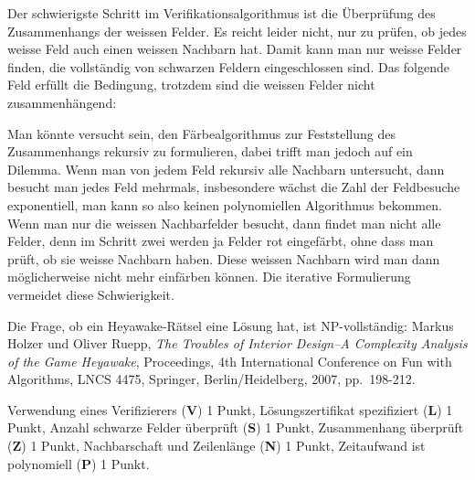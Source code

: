 \begin{diskussion}
Der schwierigste Schritt im Verifikationsalgorithmus ist die Überprüfung
des Zusammenhangs der weissen Felder.
Es reicht leider nicht, nur zu prüfen, ob jedes weisse Feld auch einen
weissen Nachbarn hat.
Damit kann man nur weisse Felder finden, die vollständig von schwarzen
Feldern eingeschlossen sind.
Das folgende Feld erfüllt die Bedingung, trotzdem sind die weissen
Felder nicht zusammenhängend:
\begin{center}
\def\h{1}
\end{center}

Man könnte versucht sein, den Färbealgorithmus zur Feststellung des
Zusammenhangs rekursiv zu formulieren, dabei trifft man jedoch auf ein
Dilemma.
Wenn man von jedem Feld rekursiv alle Nachbarn untersucht, dann besucht
man jedes Feld mehrmals, insbesondere wächst die Zahl der Feldbesuche
exponentiell, man kann so also keinen polynomiellen Algorithmus bekommen.
Wenn man nur die weissen Nachbarfelder besucht, dann findet man nicht
alle Felder, denn im Schritt zwei werden ja Felder rot eingefärbt, ohne 
dass man prüft, ob sie weisse Nachbarn haben.
Diese weissen Nachbarn wird man dann möglicherweise nicht mehr einfärben
können.
Die iterative Formulierung vermeidet diese Schwierigkeit.

Die Frage, ob ein Heyawake-Rätsel eine Lösung hat, ist NP-vollständig:
Markus Holzer und Oliver Ruepp, {\it The Troubles of Interior Design--A
Complexity Analysis of the Game Heyawake}, Proceedings,
4th International Conference on Fun with Algorithms, LNCS 4475, Springer,
Berlin/Heidelberg, 2007, pp.~198-212.
\end{diskussion}

\begin{bewertung}
Verwendung eines Verifizierers ({\bf V}) 1 Punkt,
Lösungszertifikat spezifiziert ({\bf L}) 1 Punkt,
Anzahl schwarze Felder überprüft ({\bf S}) 1 Punkt,
Zusammenhang überprüft ({\bf Z}) 1 Punkt,
Nachbarschaft und Zeilenlänge ({\bf N}) 1 Punkt,
Zeitaufwand ist polynomiell ({\bf P}) 1 Punkt.
\end{bewertung}
